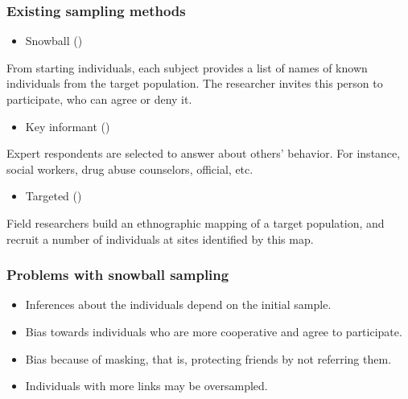 \documentclass{beamer}
\begin{document}
\begin{frame}
    
    \frametitle{Existing sampling methods}

    \begin{itemize}
        \item Snowball (\cite{goodman1961})
    \end{itemize}

    From starting individuals, each subject provides a list of names of known
    individuals from the target population. The researcher invites this person
    to participate, who can agree or deny it. 

    \vspace{2ex}

    \begin{itemize}
      \item Key informant (\cite{deaux-callaghan1985})
    \end{itemize}

    Expert respondents are selected to answer about others' behavior. For
    instance, social workers, drug abuse counselors, official, etc. 

    \vspace{2ex}

    \begin{itemize}
      \item Targeted (\cite{watters-biernacki1989})
    \end{itemize}

   Field researchers build an ethnographic mapping of a target population, and
   recruit a number of individuals at sites identified by this map.

\end{frame}

\begin{frame}

  \frametitle{Problems with snowball sampling}

  \begin{itemize}
    \item Inferences about the individuals depend on the initial sample. 
    \item Bias towards individuals who are more cooperative and agree to
    participate. 
    \item Bias because of masking, that is, protecting friends by not
    referring them. 
    \item Individuals with more links may be oversampled.  
  \end{itemize}
  
\end{frame}
\end{document}

